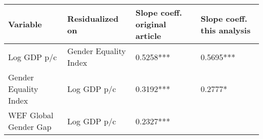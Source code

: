 \documentclass[
  11pt,
]{article}
\begin{document}
\begin{longtable}[]{@{}llll@{}}
\toprule
\begin{minipage}[b]{0.22\columnwidth}\raggedright
Variable\strut
\end{minipage} & \begin{minipage}[b]{0.22\columnwidth}\raggedright
Residualized on\strut
\end{minipage} & \begin{minipage}[b]{0.22\columnwidth}\raggedright
Slope coeff. original article\strut
\end{minipage} & \begin{minipage}[b]{0.22\columnwidth}\raggedright
Slope coeff. this analysis\strut
\end{minipage}\tabularnewline
\midrule
\endhead
\begin{minipage}[t]{0.22\columnwidth}\raggedright
Log GDP p/c\strut
\end{minipage} & \begin{minipage}[t]{0.22\columnwidth}\raggedright
Gender Equality Index\strut
\end{minipage} & \begin{minipage}[t]{0.22\columnwidth}\raggedright
0.5258***\strut
\end{minipage} & \begin{minipage}[t]{0.22\columnwidth}\raggedright
0.5695***\strut
\end{minipage}\tabularnewline
\begin{minipage}[t]{0.22\columnwidth}\raggedright
Gender Equality Index\strut
\end{minipage} & \begin{minipage}[t]{0.22\columnwidth}\raggedright
Log GDP p/c\strut
\end{minipage} & \begin{minipage}[t]{0.22\columnwidth}\raggedright
0.3192***\strut
\end{minipage} & \begin{minipage}[t]{0.22\columnwidth}\raggedright
0.2777*\strut
\end{minipage}\tabularnewline
\begin{minipage}[t]{0.22\columnwidth}\raggedright
WEF Global Gender Gap\strut
\end{minipage} & \begin{minipage}[t]{0.22\columnwidth}\raggedright
Log GDP p/c\strut
\end{minipage} & \begin{minipage}[t]{0.22\columnwidth}\raggedright
0.2327***\strut

\end{minipage}
\end{longtable}
\end{document}
